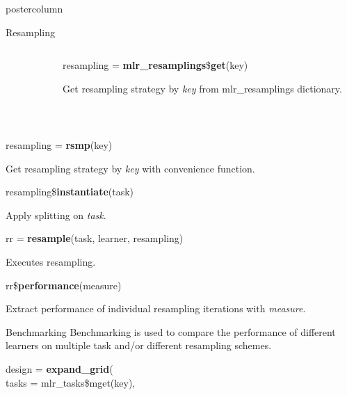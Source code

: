 \documentclass{beamer}
\begin{document}
\begin{frame}[fragile]{}
\begin{columns}
\begin{column}{.245\textwidth}
\begin{beamercolorbox}[center]{postercolumn}
\begin{minipage}{.98\textwidth}
{\begin{myblock}{Resampling}
\begin{minipage}{\textwidth}
\begin{columns}[T]
\begin{column}{0.2\textwidth}
								    \end{column}
							    	\begin{column}{0.01\textwidth}
							    	\end{column}
								    \begin{column}{0.79\textwidth}
										  \begin{codebox}
										    resampling = \textbf{mlr\_resamplings}\$\textbf{get}(key)
										  \end{codebox}
										  Get resampling strategy by \textit{key} from mlr\_resamplings dictionary.
								    \end{column}
							     \end{columns}
					      	\end{minipage}
						      \\[\baselineskip]
						      \begin{codebox}
						      	resampling = \textbf{rsmp}(key)
						      \end{codebox}
						      Get resampling strategy by \textit{key} with convenience function.
						      \\
						      \begin{codebox}
							      resampling\$\textbf{instantiate}(task)
						      \end{codebox}
						      Apply splitting on \textit{task}.
						      \\
					      	\begin{codebox}
							      rr = \textbf{resample}(task, learner, resampling)
						      \end{codebox}
						      Executes resampling.
						      \\
						      \begin{codebox}
							      rr\$\textbf{performance}(measure)
						      \end{codebox}
						      Extract performance of individual resampling iterations with \textit{measure}.
					      \end{myblock}
				        \begin{myblock}{Benchmarking}
						      Benchmarking is used to compare the performance of different learners on multiple task and/or different resampling schemes.
						    \\
						      \begin{codeboxmultiline}[width=21.95cm]
							      design = \textbf{expand\_grid}(\\
							      \hspace*{1ex}tasks = mlr\_tasks\$mget(key),\\

\end{codeboxmultiline}
\end{myblock}}
\end{minipage}
\end{beamercolorbox}
\end{column}
\end{columns}
\end{frame}
\end{document}

